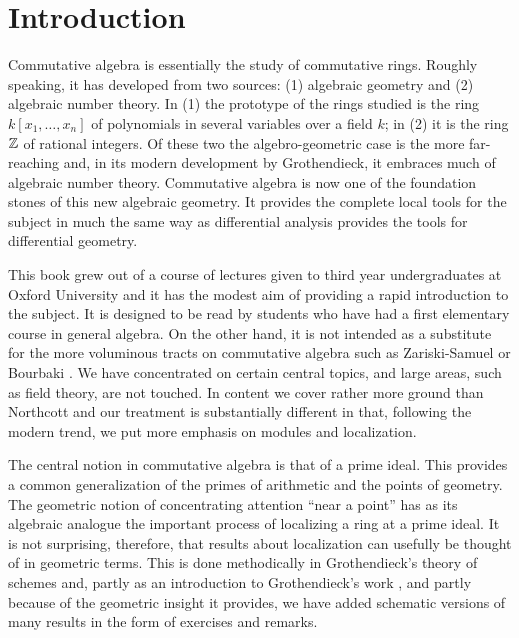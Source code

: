 \chapter*{Introduction}

Commutative algebra is essentially the study of commutative rings. Roughly speaking, it has developed from two sources: (1) algebraic geometry and (2) algebraic number theory. In (1) the prototype of the rings studied is the ring $k[x_1, \ldots, x_n]$ of polynomials in several variables over a field $k$; in (2) it is the ring $\mathbb{Z}$ of rational integers. Of these two the algebro-geometric case is the more far-reaching and, in its modern development by Grothendieck, it embraces much of algebraic number theory. Commutative algebra is now one of the foundation stones of this new algebraic geometry. It provides the complete local tools for the subject in much the same way as differential analysis provides the tools for differential geometry.

This book grew out of a course of lectures given to third year undergraduates at Oxford University and it has the modest aim of providing a rapid introduction to the subject. It is designed to be read by students who have had a first elementary course in general algebra. On the other hand, it is not intended as a substitute for the more voluminous tracts on commutative algebra such as Zariski-Samuel \cite{ZariskiSamuel} or Bourbaki \cite{Bourbaki}. We have concentrated on certain central topics, and large areas, such as field theory, are not touched. In content we cover rather more ground than Northcott \cite{Northcott} and our treatment is substantially different in that, following the modern trend, we put more emphasis on modules and localization.

The central notion in commutative algebra is that of a prime ideal. This provides a common generalization of the primes of arithmetic and the points of geometry. The geometric notion of concentrating attention ``near a point'' has as its algebraic analogue the important process of localizing a ring at a prime ideal. It is not surprising, therefore, that results about localization can usefully be thought of in geometric terms. This is done methodically in Grothendieck's theory of schemes and, partly as an introduction to Grothendieck's work \cite{Grothendieck}, and partly because of the geometric insight it provides, we have added schematic versions of many results in the form of exercises and remarks.


